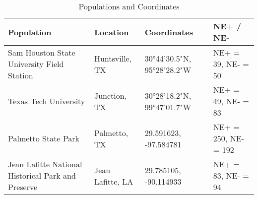 \documentclass[12pt]{article}\usepackage[]{graphicx}\usepackage[dvipsnames]{xcolor}
\begin{document}
\begin{table}[ht]
\centering
\caption{Populations and Coordinates}
\begin{tabular}{|p{2in}|l|l|l|}
\hline
\textbf{Population} & \textbf{Location} & \textbf{Coordinates} & \textbf{NE+ / NE-} \\ \hline
Sam Houston State University Field Station  & Huntsville, TX & 30°44'30.5"N, 95°28'28.2"W & NE+ = 39, NE- = 50 \\ \hline
Texas Tech University  & Junction, TX & 30°28'18.2"N, 99°47'01.7"W & NE+ = 49, NE- = 83 \\ \hline
Palmetto State Park  & Palmetto, TX & 29.591623, -97.584781 & NE+ = 250, NE- = 192 \\ \hline
Jean Lafitte National Historical Park and Preserve  & Jean Lafitte, LA & 29.785105, -90.114933 & NE+ = 83, NE- = 94 \\ \hline
\end{tabular}
\end{table}


\end{document}
